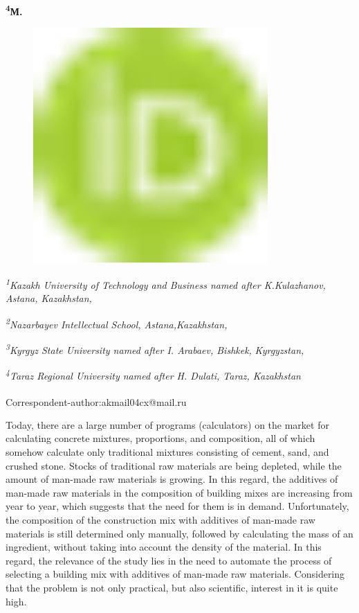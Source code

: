 {\bfseries \textsuperscript{4}М.
\begin{figure}[H]
	\centering
	\includegraphics[width=0.8\textwidth]{media/ict3/image1}
	\caption*{}
\end{figure}


\emph{\textsuperscript{1}Kazakh University of Technology and Business
named after K.Kulazhanov, Astana, Kazakhstan,}

\emph{\textsuperscript{2}Nazarbayev Intellectual School,
Astana,Kazakhstan,}

\emph{\textsuperscript{3}Kyrgyz State University named after I. Arabaev,
Bishkek,} \emph{Kyrgyzstan,}

\emph{\textsuperscript{4}Taraz Regional University named after H.
Dulati, Taraz, Kazakhstan}

{\bfseries \textsuperscript{\envelope }}Correspondent-author:akmail04cx@mail.ru

Today, there are a large number of programs (calculators) on the market
for calculating concrete mixtures, proportions, and composition, all of
which somehow calculate only traditional mixtures consisting of cement,
sand, and crushed stone. Stocks of traditional raw materials are being
depleted, while the amount of man-made raw materials is growing. In this
regard, the additives of man-made raw materials in the composition of
building mixes are increasing from year to year, which suggests that the
need for them is in demand. Unfortunately, the composition of the
construction mix with additives of man-made raw materials is still
determined only manually, followed by calculating the mass of an
ingredient, without taking into account the density of the material. In
this regard, the relevance of the study lies in the need to automate the
process of selecting a building mix with additives of man-made raw
materials. Considering that the problem is not only practical, but also
scientific, interest in it is quite high.

}
